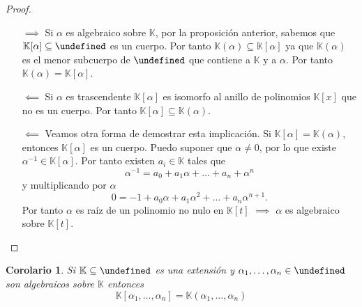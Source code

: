 \documentclass[10pt, spanish]{report}
\newtheorem*{cor}{Corolario}
\theoremstyle{definition}
\newcommand{\K}{\mathbb{K}}
\let\L\undefined
\newcommand{\L}{\mathbb{L}}
\newcommand{\fecha}[1]{\marginpar{\underline{#1}}}
\begin{document}
\fecha{23/02}
\begin{proof}\hspace{1em}
    \begin{itemize}[itemindent=14pt]
        \item[$\implies$]  Si $\alpha$ es algebraico sobre $\K$, por la proposición
            anterior, sabemos que $\K[\alpha]\subseteq\L$ es un cuerpo. Por
            tanto $\K(\alpha)\subseteq\K[\alpha]$ ya que $\K(\alpha)$ es el
            menor subcuerpo de $\L$ que contiene a $\K$ y a $\alpha$. Por tanto
            $\K(\alpha)=\K[\alpha]$.
        \item[$\impliedby$]  Si $\alpha$ es trascendente $\K[\alpha]$ es
            isomorfo al anillo de polinomios $\K[x]$ que no es un cuerpo. Por
            tanto $\K[\alpha]\subseteq\K(\alpha)$.
        \item[$\impliedby$] Veamos otra forma de demostrar esta implicación. Si
            $\K[\alpha]=\K(\alpha)$, entonces $\K[\alpha]$ es un cuerpo. Puedo
            suponer que $\alpha\neq0$, por lo que existe $\alpha^{-1}\in
            \K[\alpha]$. Por tanto existen $a_i\in \K$ tales que
            \[\alpha^{-1}=a_0+a_1\alpha+\ldots+a_n+\alpha^n\] y multiplicando
            por $\alpha$ \[0=-1+a_0\alpha+a_1\alpha^2+\ldots+a_n\alpha^{n+1}.\]
            Por tanto $\alpha$ es raíz de un polinomio no nulo en $\K[t]$
            $\implies$
            $\alpha$ es algebraico sobre $\K[t]$.
    \end{itemize}
\end{proof}

\begin{cor}
    Si $\K\subseteq\L$ es una extensión y $\alpha_1,\ldots,\alpha_n\in\L$ son
    algebraicos sobre $\K$ entonces \[\K[\alpha_1,\ldots,\alpha_n]=
    \K(\alpha_1,\ldots,\alpha_n)\]
\end{cor}
\end{document}
